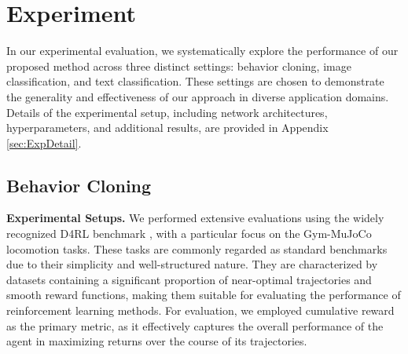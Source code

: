 \section{Experiment}
\label{sec:Exp}
In our experimental evaluation, we systematically explore the performance of our proposed method across three distinct settings: behavior cloning, image classification, and text classification. These settings are chosen to demonstrate the generality and effectiveness of our approach in diverse application domains. 
%
Details of the experimental setup, including network architectures, hyperparameters, and additional results, are provided in Appendix \ref{sec:ExpDetail}.

\subsection{Behavior Cloning}
\textbf{Experimental Setups.} We performed extensive evaluations using the widely recognized D4RL benchmark \citep{fu2020d4rl}, with a particular focus on the Gym-MuJoCo locomotion tasks. These tasks are commonly regarded as standard benchmarks due to their simplicity and well-structured nature. They are characterized by datasets containing a significant proportion of near-optimal trajectories and smooth reward functions, making them suitable for evaluating the performance of reinforcement learning methods. 
%
For evaluation, we employed cumulative reward as the primary metric, as it effectively captures the overall performance of the agent in maximizing returns over the course of its trajectories. 

